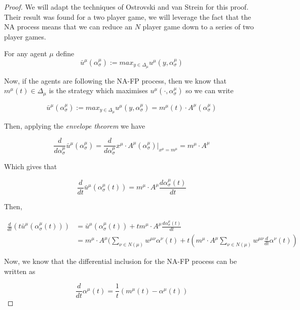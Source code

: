 \documentclass{article}
\theoremstyle{definition}
\begin{document}
	\begin{proof}
		We will adapt the techniques of Ostrovski and van Strein for this proof. Their result was found for a two player game, we will leverage the fact that the NA process means that we can reduce an $N$ player game down to a series of two player games. 
		
		For any agent $\mu$ define
		\begin{equation}
			\bar{u}^\mu (\alpha_\sigma^\mu) := max_{y \in \Delta_\mu} u^\mu(y, \alpha_\sigma^\mu)
		\end{equation}

		Now, if the agents are following the NA-FP process, then we know that $m^\mu (t) \in \Delta_\mu$ is the strategy which maximises $u^\mu( \cdot, \alpha_\sigma^\mu)$ so we can write 

		\begin{equation}
			\bar{u}^\mu (\alpha_\sigma^\mu) := max_{y \in \Delta_\mu} u^\mu(y, \alpha_\sigma^\mu) = m^\mu(t) \cdot A^\mu (\alpha_\sigma^\mu)
		\end{equation}

		Then, applying the \emph{envelope theorem} \cite{} we have

		\begin{equation}
			\frac{d}{d \alpha_\sigma^\mu} \bar{u}^\mu (\alpha_\sigma^\mu) = \frac{d}{d \alpha_\sigma^\mu} x^\mu \cdot A^\mu (\alpha_\sigma^\mu) \Big |_{x^\mu = m^\mu} = m^\mu \cdot A^\mu
		\end{equation}

		Which gives that 

		\begin{equation}
			\frac{d}{dt} \bar{u}^\mu (\alpha_\sigma^\mu (t)) = m^\mu \cdot A^\mu \frac{d \alpha_\sigma^\mu (t)}{dt}
		\end{equation}

		Then, 

		\begin{align}
			\frac{d}{dt} (t \bar{u}^\mu (\alpha_\sigma^\mu (t))) & =  \bar{u}^\mu (\alpha_\sigma^\mu (t)) + t m^\mu \cdot A^\mu \frac{d \alpha_\sigma^\mu (t)}{dt} \\
			& = m^\mu \cdot A^\mu (\sum_{\nu \in N(\mu)} w^{\mu \nu} \alpha^\nu (t) + t (m^\mu \cdot A^\mu \sum_{\nu \in N(\mu)} w^{\mu \nu} \frac{d}{dt} \alpha^\nu(t))
		\end{align} 

		Now, we know that the differential inclusion for the NA-FP process can be written as

		\begin{equation}
			\frac{d}{dt} \alpha^\mu (t) = \frac{1}{t} (m^\mu(t) - \alpha^\mu (t))
		\end{equation}


\end{proof}
\end{document}
